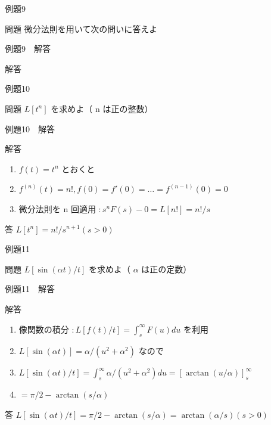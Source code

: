 \documentclass[aspectratio=43,professionalfonts,handout]{beamer}
\begin{document}
\begin{frame}{例題9}
  \begin{exampleblock}{問題}
    微分法則を用いて次の問いに答えよ\\[2pt]
  \end{exampleblock}
\end{frame}

\begin{frame}{例題9　解答}
  \begin{exampleblock}{解答}
  \end{exampleblock}
\end{frame}

\begin{frame}{例題10}
  \begin{exampleblock}{問題}
    $L[t^n]$ を求めよ（ n は正の整数）\\[2pt]
  \end{exampleblock}
\end{frame}

\begin{frame}{例題10　解答}
  \begin{exampleblock}{解答}
  \begin{enumerate}[1.]
    \item[] $f(t) = t^n$ とおくと
    \item[] $f^{(n)}(t) = n!, f(0) = f'(0) = \ldots = f^{(n-1)}(0) = 0$
    \item[] 微分法則を n 回適用 $: s^n F(s) - 0 = L[n!] = n!/s$
  \end{enumerate}
  \end{exampleblock}
  \begin{alertblock}{答}
    $L[t^n] = n!/s^{n+1}  (s > 0)$
  \end{alertblock}
\end{frame}

\begin{frame}{例題11}
  \begin{exampleblock}{問題}
    $L[\sin(\alpha t)/t]$ を求めよ（ $\alpha$ は正の定数）\\[2pt]
  \end{exampleblock}
\end{frame}

\begin{frame}{例題11　解答}
  \begin{exampleblock}{解答}
  \begin{enumerate}[1.]
    \item[] 像関数の積分 $: L[f(t)/t] = \int_{s}^\infty F(u)du$ を利用
    \item[] $L[\sin(\alpha t)] = \alpha/(u^{2}+\alpha^{2})$ なので
    \item[] $L[\sin(\alpha t)/t] = \int_{s}^\infty \alpha/(u^{2}+\alpha^{2}) du = [\arctan(u/\alpha)]_{s}^\infty$
    \item[] $= \pi/2 - \arctan(s/\alpha)$
  \end{enumerate}
  \end{exampleblock}
  \begin{alertblock}{答}
    $L[\sin(\alpha t)/t] = \pi/2 - \arctan(s/\alpha) = \arctan(\alpha/s)  (s > 0)$
  \end{alertblock}
\end{frame}
\end{document}
